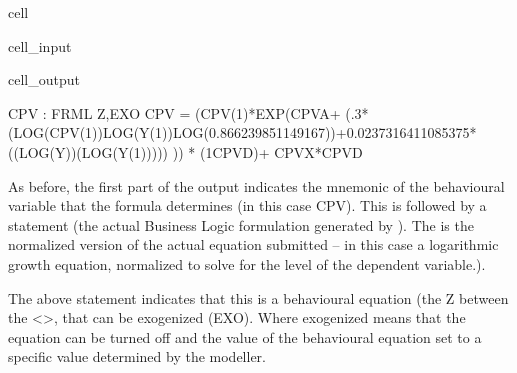 \documentclass[letterpaper,10pt,english]{jupyterBook}
\begin{document}
\begin{sphinxuseclass}{cell}\begin{sphinxVerbatimInput}

\begin{sphinxuseclass}{cell_input}
\begin{sphinxVerbatim}[commandchars=\\\{\}]
\PYG{p}{[}\PYG{p}{]}
\end{sphinxVerbatim}

\end{sphinxuseclass}\end{sphinxVerbatimInput}
\begin{sphinxVerbatimOutput}

\begin{sphinxuseclass}{cell_output}
\begin{sphinxVerbatim}[commandchars=\\\{\}]
CPV : FRML \PYGZlt{}Z,EXO\PYGZgt{} CPV = (CPV(\PYGZhy{}1)*EXP(CPV\PYGZus{}A+ (\PYGZhy{}.3*(LOG(CPV(\PYGZhy{}1))\PYGZhy{}LOG(Y(\PYGZhy{}1))\PYGZhy{}LOG(0.866239851149167))+0.0237316411085375*((LOG(Y))\PYGZhy{}(LOG(Y(\PYGZhy{}1))))) )) * (1\PYGZhy{}CPV\PYGZus{}D)+ CPV\PYGZus{}X*CPV\PYGZus{}D \PYGZdl{}
\end{sphinxVerbatim}

\end{sphinxuseclass}\end{sphinxVerbatimOutput}

\end{sphinxuseclass}
\sphinxAtStartPar
As before, the first part of the  output indicates the mnemonic of the behavioural variable that the formula determines (in this case CPV).  This is followed by a  statement (the actual Business Logic formulation generated by ). The  is the normalized version of the actual equation submitted – in this case a logarithmic growth equation, normalized to solve for the level of the dependent variable.).

\sphinxAtStartPar
The above  statement indicates that this is a behavioural equation (the Z between the <>, that can be exogenized (EXO).  Where exogenized means that the equation can be turned off and the value of the behavioural equation set to a specific value determined by the modeller.
\end{document}
